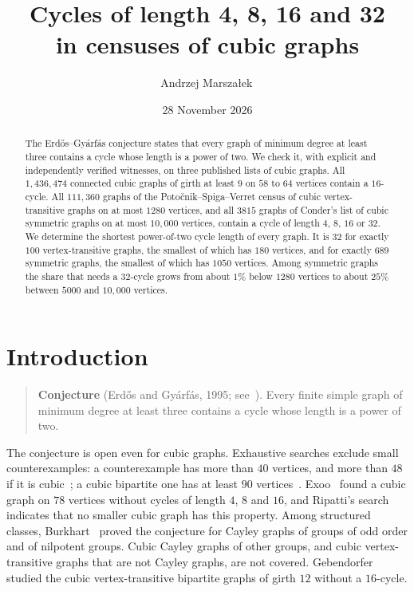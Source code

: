 \documentclass[11pt]{amsart}
\title[Power-of-two cycles in censuses of cubic graphs]{Cycles of length 4, 8, 16 and 32\\ in censuses of cubic graphs}
\author[A. Marszałek]{Andrzej Marszałek\,\orcidlink{0009-0006-6148-2965}}
\date{28 November 2026}
\theoremstyle{remark}
\begin{document}
\begin{abstract}
The Erdős–Gyárfás conjecture states that every graph of minimum degree at least
three contains a cycle whose length is a power of two. We check it, with
explicit and independently verified witnesses, on three published lists of
cubic graphs. All $1{,}436{,}474$ connected cubic graphs of girth at least $9$
on $58$ to $64$ vertices contain a $16$-cycle. All $111{,}360$ graphs of the
Potočnik--Spiga--Verret census of cubic vertex-transitive graphs on at most
$1280$ vertices, and all $3815$ graphs of Conder's list of cubic symmetric
graphs on at most $10{,}000$ vertices, contain a cycle of length $4$, $8$, $16$
or $32$. We determine the shortest power-of-two cycle length of every graph.
It is $32$ for exactly $100$ vertex-transitive graphs, the smallest of which has
$180$ vertices, and for exactly $689$ symmetric graphs, the smallest of which has
$1050$ vertices. Among symmetric graphs the share that needs a $32$-cycle grows
from about $1\%$ below $1280$ vertices to about $25\%$ between $5000$ and
$10{,}000$ vertices.
\end{abstract}

\maketitle

\section{Introduction}

\begin{quote}
\textbf{Conjecture} (Erdős and Gyárfás, 1995; see~\cite{Erdos1997}).
Every finite simple graph of minimum degree at least three contains a cycle
whose length is a power of two.
\end{quote}

The conjecture is open even for cubic graphs. Exhaustive searches exclude small
counterexamples: a counterexample has more than $40$ vertices, and more than
$48$ if it is cubic~\cite{DucoffeDumitru2026}; a cubic bipartite one has at
least $90$ vertices~\cite{Marszalek2026b}. Exoo~\cite{Exoo2014} found a cubic
graph on $78$ vertices without cycles of length $4$, $8$ and $16$, and Ripatti's
search~\cite{Ripatti2017} indicates that no smaller cubic graph has this
property. Among structured classes, Burkhart~\cite{Burkhart2026} proved the
conjecture for Cayley graphs of groups of odd order and of nilpotent groups.
Cubic Cayley graphs of other groups, and cubic vertex-transitive graphs that are
not Cayley graphs, are not covered. Gebendorfer~\cite{Gebendorfer2026} studied
the cubic vertex-transitive bipartite graphs of girth $12$ without a $16$-cycle.
\end{document}
